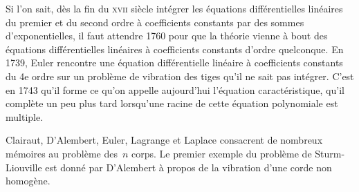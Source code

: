 \begin{histoire}
\medskip
Si l'on sait, dès la fin du \textsc{xvii} siècle intégrer les équations différentielles linéaires du premier et du second ordre 
à coefficients constants par des sommes d'exponentielles, il faut attendre 1760 pour que la 
théorie vienne à bout des équations différentielles linéaires à coefficients constants d'ordre quelconque. 
En 1739, Euler 
rencontre une équation différentielle linéaire à coefficients constants du 4e ordre 
sur un problème de vibration des tiges qu'il ne sait pas intégrer. 
C'est en 1743 qu'il forme ce qu'on appelle aujourd'hui l'équation caractéristique, qu'il complète
un peu plus tard lorsqu'une racine de cette équation polynomiale est multiple.

\medskip
{}

\medskip
Clairaut, D'Alembert, Euler, Lagrange et Laplace consacrent de nombreux mémoires au problème
des~$n$ corps.
Le premier exemple du problème de Sturm-Liouville
 est donné par D'Alembert 
à propos de la vibration d'une corde non homogène.
\end{histoire}

